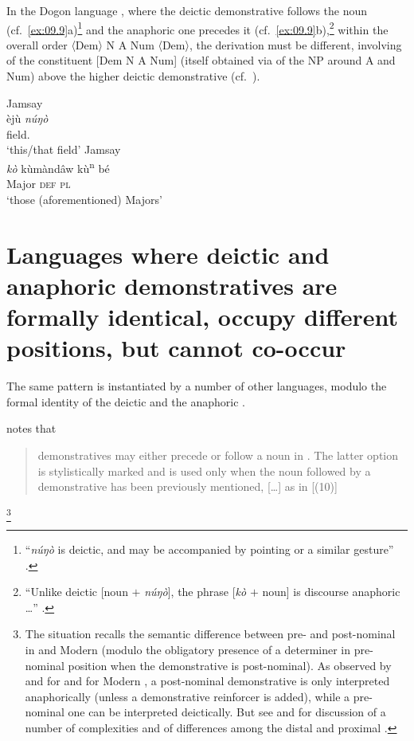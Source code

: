 \documentclass[output=paper]{langsci/langscibook}
\begin{document}
In the Dogon language , where the deictic demonstrative follows
the noun (cf.~\ref{ex:09.9}a)\footnote{\enquote{\emph{núŋò} is deictic, and may be
accompanied by pointing or a similar gesture} \parencite[162]{Heath2008}.} and
the anaphoric one precedes it (cf.~\ref{ex:09.9}b),\footnote{\enquote{Unlike deictic
[noun $+$ \emph{núŋò}], the phrase [\emph{kò} $+$ noun] is discourse anaphoric
\dots{}} \parencite[164]{Heath2008}.} within the overall order
〈Dem〉 N A Num 〈Dem〉, the derivation must be
different, involving  of the constituent [Dem N A Num]
(itself obtained via  of the NP around A and Num) above the higher
deictic demonstrative (cf.\  \citealt{Cinque2005,Cinque2017}).

\ea\label{ex:09.9}
	\ea Jamsay \parencite[161]{Heath2008}\\
		\gll èjù  \textit{núŋò}\\
                field.\Ll{} {\Dem{}}\\
		\glt ‘this/that field’
	\ex Jamsay \parencite[164]{Heath2008}\\
		\gll \textit{kò}  kùmàndâw kù\textsuperscript{n} bé\\
            {\Dem{}} Major \textsc{def} \textsc{pl}\\
		\glt ‘those (aforementioned) Majors’
	\z
\z

\section{Languages where deictic and anaphoric demonstratives are formally
identical, occupy different positions, but cannot co-occur}

The same pattern is instantiated by a number of other languages, modulo the
formal identity of the deictic and the anaphoric .

\textcite[142]{Migdalski2001} notes that \blockquote{demonstratives may either
    precede or follow a noun in . The latter option is
    stylistically marked and is used only when the noun followed by a
    demonstrative has been previously mentioned, [\dots{}] as in
    [(10)]}:\footnote{The  situation recalls the semantic difference
    between pre- and post-nominal  in  and Modern
    (modulo the obligatory presence of a determiner in pre-nominal position
    when the demonstrative is post-nominal). As observed by
    \citet{Bernstein1997} and \citet{Taboada2007} for  and
    \citet{Panagiotidis2000} for Modern , a post-nominal
    demonstrative is only interpreted anaphorically (unless a demonstrative
    reinforcer is added), while a pre-nominal one can be interpreted
    deictically. But see \textcite[50, n.\ 27]{Bruge2002} and \textcite[§2.5.3,
p.\ 167, n.\ 51]{Bruge2000} for discussion of a number of complexities and of
differences among the  distal and proximal .}
\end{document}
